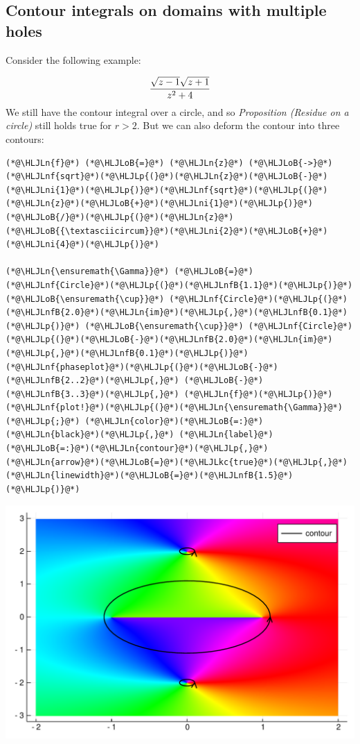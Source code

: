 \documentclass[12pt,a4paper]{article}
\newcommand{\HLJLkc}[1]{\textcolor[RGB]{59,151,46}{\textit{#1}}}
\newcommand{\HLJLn}[1]{#1}
\newcommand{\HLJLnf}[1]{\textcolor[RGB]{66,102,213}{#1}}
\newcommand{\HLJLnfB}[1]{\textcolor[RGB]{59,151,46}{#1}}
\newcommand{\HLJLni}[1]{\textcolor[RGB]{59,151,46}{#1}}
\newcommand{\HLJLoB}[1]{\textcolor[RGB]{102,102,102}{\textbf{#1}}}
\newcommand{\HLJLp}[1]{#1}
\begin{document}
\subsection{Contour integrals on domains with multiple holes}
Consider the following example:

\[
    {\sqrt{z-1}\sqrt{z+1} \over z^2 + 4}
\]
We still have the contour integral over a circle, and so \emph{Proposition (Residue on a circle)} still holds true for $r > 2$. But we can also deform the contour into three contours:


\begin{lstlisting}
(*@\HLJLn{f}@*) (*@\HLJLoB{=}@*) (*@\HLJLn{z}@*) (*@\HLJLoB{->}@*) (*@\HLJLnf{sqrt}@*)(*@\HLJLp{(}@*)(*@\HLJLn{z}@*)(*@\HLJLoB{-}@*)(*@\HLJLni{1}@*)(*@\HLJLp{)}@*)(*@\HLJLnf{sqrt}@*)(*@\HLJLp{(}@*)(*@\HLJLn{z}@*)(*@\HLJLoB{+}@*)(*@\HLJLni{1}@*)(*@\HLJLp{)}@*)(*@\HLJLoB{/}@*)(*@\HLJLp{(}@*)(*@\HLJLn{z}@*)(*@\HLJLoB{{\textasciicircum}}@*)(*@\HLJLni{2}@*)(*@\HLJLoB{+}@*)(*@\HLJLni{4}@*)(*@\HLJLp{)}@*)

(*@\HLJLn{\ensuremath{\Gamma}}@*) (*@\HLJLoB{=}@*) (*@\HLJLnf{Circle}@*)(*@\HLJLp{(}@*)(*@\HLJLnfB{1.1}@*)(*@\HLJLp{)}@*) (*@\HLJLoB{\ensuremath{\cup}}@*) (*@\HLJLnf{Circle}@*)(*@\HLJLp{(}@*)(*@\HLJLnfB{2.0}@*)(*@\HLJLn{im}@*)(*@\HLJLp{,}@*)(*@\HLJLnfB{0.1}@*)(*@\HLJLp{)}@*) (*@\HLJLoB{\ensuremath{\cup}}@*) (*@\HLJLnf{Circle}@*)(*@\HLJLp{(}@*)(*@\HLJLoB{-}@*)(*@\HLJLnfB{2.0}@*)(*@\HLJLn{im}@*)(*@\HLJLp{,}@*)(*@\HLJLnfB{0.1}@*)(*@\HLJLp{)}@*)
(*@\HLJLnf{phaseplot}@*)(*@\HLJLp{(}@*)(*@\HLJLoB{-}@*)(*@\HLJLnfB{2..2}@*)(*@\HLJLp{,}@*) (*@\HLJLoB{-}@*)(*@\HLJLnfB{3..3}@*)(*@\HLJLp{,}@*) (*@\HLJLn{f}@*)(*@\HLJLp{)}@*)
(*@\HLJLnf{plot!}@*)(*@\HLJLp{(}@*)(*@\HLJLn{\ensuremath{\Gamma}}@*)(*@\HLJLp{;}@*) (*@\HLJLn{color}@*)(*@\HLJLoB{=:}@*)(*@\HLJLn{black}@*)(*@\HLJLp{,}@*) (*@\HLJLn{label}@*)(*@\HLJLoB{=:}@*)(*@\HLJLn{contour}@*)(*@\HLJLp{,}@*) (*@\HLJLn{arrow}@*)(*@\HLJLoB{=}@*)(*@\HLJLkc{true}@*)(*@\HLJLp{,}@*) (*@\HLJLn{linewidth}@*)(*@\HLJLoB{=}@*)(*@\HLJLnfB{1.5}@*)(*@\HLJLp{)}@*)
\end{lstlisting}

\includegraphics[width=\linewidth]{figures/Lecture3_7_1.pdf}
\end{document}
